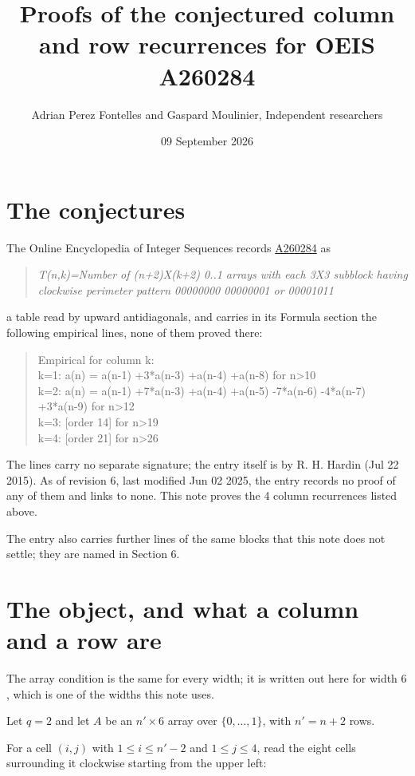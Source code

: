 \documentclass[11pt]{article}
\title{Proofs of the conjectured column and row recurrences for OEIS A260284}
\author{Adrian Perez Fontelles and Gaspard Moulinier, Independent researchers}
\date{09 September 2026}
\theoremstyle{definition}
\begin{document}
\maketitle
\section{The conjectures}

The Online Encyclopedia of Integer Sequences records \href{https://oeis.org/A260284}{A260284} as

\begin{quote}\itshape T(n,k)=Number of (n+2)X(k+2) 0..1 arrays with each 3X3 subblock having clockwise perimeter pattern 00000000 00000001 or 00001011\end{quote}

a table read by upward antidiagonals, and carries in its Formula section the following empirical lines, none of them proved there:

\begin{quote}\ttfamily Empirical for column k:\\
k=1: a(n) = a(n-1) +3*a(n-3) +a(n-4) +a(n-8) for n>10\\k=2: a(n) = a(n-1) +7*a(n-3) +a(n-4) +a(n-5) -7*a(n-6) -4*a(n-7) +3*a(n-9) for n>12\\k=3: [order 14] for n>19\\k=4: [order 21] for n>26\end{quote}

The lines carry no separate signature; the entry itself is by R. H. Hardin (Jul 22 2015). As of revision 6, last modified Jun 02 2025, the entry records no proof of any of them and links to none. This note proves the 4 column recurrences listed above.

The entry also carries further lines of the same blocks that this note does not settle; they are named in Section 6.

\section{The object, and what a column and a row are}

The array condition is the same for every width; it is written out here for width $6$, which is one of the widths this note uses.

Let $q = 2$ and let $A$ be an $n' \times 6$ array over $\{0,\dots,1\}$, with $n' = n + 2$ rows.

For a cell $(i,j)$ with $1 \le i \le n'-2$ and $1 \le j \le 4$, read the eight cells surrounding it clockwise starting from the upper left:
\end{document}
